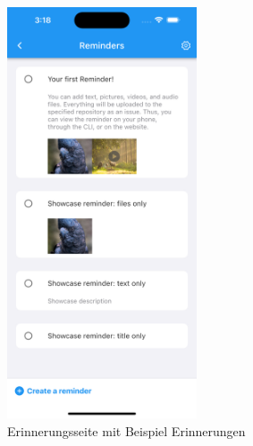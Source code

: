 \begin{figure}
    \centering
    \includegraphics[width=0.5\textwidth]{res/reminders_page.png} 
    \caption{Erinnerungsseite mit Beispiel Erinnerungen} 
    \label{pic:reminders_page}
\end{figure}


